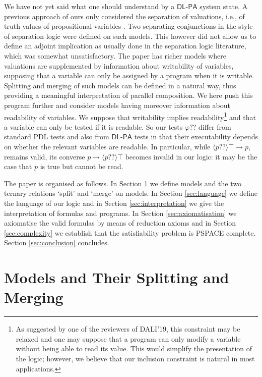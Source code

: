 \documentclass{llncs}
\newcommand{\testendo}{?\!\!?}			%
\newcommand{\Dlpa}{\ensuremath{\mathsf{DL\text{-}PA}}\xspace}
\newcommand{\ldia}[1]{ \big\langle #1 \big\rangle}
\newcommand{\limp}{ \rightarrow }
\renewcommand{\phi}{\varphi}
\begin{document}
We have not yet said what one should understand by a \Dlpa system state. 
A previous approach of ours only considered the separation of valuations, i.e., 
of truth values of propositional variables \cite{Herzig-Wollic13}. 
Two separating conjunctions in the style of separation logic were defined on such models. 
This however did not allow us to define an adjoint implication as usually done in the separation logic literature, which was somewhat unsatisfactory. 
The paper \cite{HerzigEtal-Ijcai19} has richer models where valuations are supplemented by information about writability of variables, 
supposing that a variable can only be assigned by a program when it is writable. 
Splitting and merging of such models can be defined in a natural way, thus providing a meaningful interpretation of parallel composition. 
We here push this program further and consider models having moreover information about readability of variables. 
We suppose that writability implies readability\footnote{%
As suggested by one of the reviewers of DALI'19, this constraint may be relaxed 
and one may suppose that a program can only modify a variable without being able to read its value. 
This would simplify the presentation of the logic; however, we believe that our inclusion constraint is natural in most applications.
}
and that a variable can only be tested if it is readable. 
So our tests $\phi \testendo$ differ from standard PDL tests and also from \Dlpa tests in that their 
executability depends on whether the relevant variables are readable. In particular, while 
$\ldia{ p \testendo } \top \limp p$, remains valid, its converse
$p \limp \ldia{ p \testendo } \top $ becomes invalid in our logic: 
it may be the case that $p$ is true but cannot be read.

The paper is organised as follows.
In Section \ref{sec:models} we define models and the two ternary relations `split' and `merge' on models. 
In Section \ref{sec:language} we define the language of our logic and 
in Section \ref{sec:interpretation} we give the interpretation of formulas and programs. 
In Section \ref{sec:axiomatisation} we axiomatise the valid formulas by means of reduction axioms and
in Section \ref{sec:complexity} we establish that the satisfiability problem is PSPACE complete. 
Section \ref{sec:conclusion} concludes. 


\section{Models and Their Splitting and Merging }\label{sec:models} 
\end{document}

